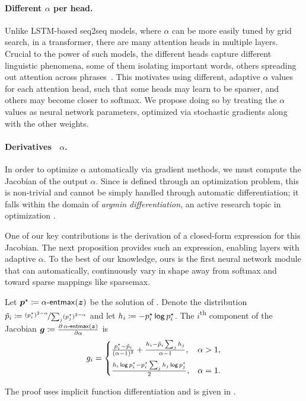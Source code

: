 \paragraph*{Different {\boldmath $\alpha$} per head.}
Unlike LSTM-based seq2seq models, where $\alpha$ can be more easily
tuned by grid search, in a transformer, there are many attention
heads in multiple layers. Crucial to the power of such models, the
different heads capture different linguistic phenomena, some of them
isolating important words, others spreading out attention across
phrases~\citep[Figure~5]{vaswani2017attention}. This motivates using
different, adaptive $\alpha$ values for each attention head, such
that some heads may learn to be sparser, and others may become closer
to softmax. We propose doing so by treating the $\alpha$ values as
neural network parameters, optimized via stochastic gradients along
with the other weights.

\paragraph*{Derivatives \wrt~{\boldmath $\alpha$}.}
In order to optimize $\alpha$ automatically via gradient methods, we
must compute the Jacobian of the \entmaxtext output \wrt $\alpha$.
Since \entmaxtext is defined through an optimization problem, this is
non-trivial and cannot be simply handled through automatic
differentiation; it falls within the domain of \emph{argmin
    differentiation}, an active research topic in optimization
\citep{gould,optnet}.

One of our key contributions is the derivation of a closed-form
expression for this Jacobian. The next proposition provides
such an expression, enabling \entmaxtext layers with
adaptive $\alpha$. To the best of our knowledge, ours is the first
neural network module that can automatically, continuously vary in
shape away from softmax and toward sparse mappings like sparsemax.

\begin{proposition}\label{prop:grad_alpha}%
    Let $\bm{p}^\star \coloneqq \mathop{\mathsf{\alpha}\textnormal{-}\mathsf{entmax}}(\bm{z})$ be the solution of
    .
    Denote the distribution $\tilde{p}_i \coloneqq \nicefrac{(p_i^\star)^{2 - \alpha}}{
            \sum_j(p_j^\star)^{2-\alpha}}$ and let
    $h_i \coloneqq -p^\star_i \operatorname*{\mathsf{log}} p^\star_i$.
    The $i$\textsuperscript{th} component of the Jacobian
    $\bm{g} \coloneqq \frac{\partial \mathop{\mathsf{\alpha}\textnormal{-}\mathsf{entmax}}(\bm{z})}{\partial \alpha}$ is
    \begin{equation}\label{eq:final_gradient_alpha}
        g_i =%
        \begin{cases}
            \frac{p_i^{\star} - \tilde{\pp}_i}{(\alpha-1)^2} +
            \frac{h_i - \tilde{\pp}_i%
                \sum_j h_j%
            }{\alpha-1},                                                                  & \alpha > 1, \\[1.5ex]
            \frac{h_i \log \pp_i^{\star} - \pp_i^{\star} \sum_j h_j \log p_j^{\star}}{2}, & \alpha = 1.
        \end{cases}
    \end{equation}
\end{proposition}
\noindent%
The proof uses implicit function differentiation and is given in .

